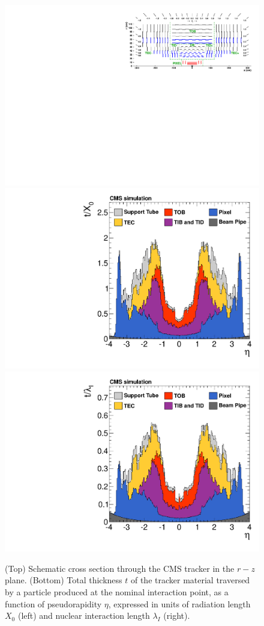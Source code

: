 \begin{figure}\centering
\includegraphics[width=.9\textwidth]{figs/cms/TrackerLayoutNew.pdf}\\
\includegraphics[width=.45\textwidth]{figs/cms/MaterialBudget_RadLengths.pdf}
\includegraphics[width=.45\textwidth]{figs/cms/MaterialBudget_InteractionLengths.pdf}
\caption{(Top) Schematic cross section through the CMS tracker in the $r-z$
  plane. (Bottom) Total thickness $t$ of the tracker material
  traversed by a particle produced at the nominal interaction point,
  as a function of pseudorapidity $\eta$, expressed in units of radiation
  length $X_0$ (left) and nuclear interaction length $\lambda_I$
  (right). \label{fig:tracker}}
\end{figure}

